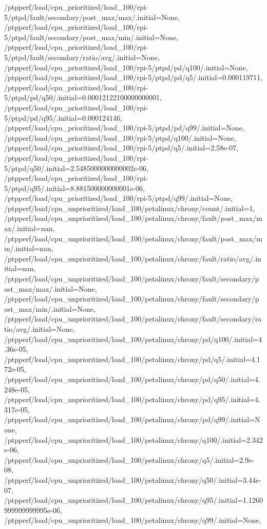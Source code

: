 {    /ptpperf/load/cpu_prioritized/load_100/rpi-5/ptpd/fault/secondary/post_max/max/.initial=None,
    /ptpperf/load/cpu_prioritized/load_100/rpi-5/ptpd/fault/secondary/post_max/min/.initial=None,
    /ptpperf/load/cpu_prioritized/load_100/rpi-5/ptpd/fault/secondary/ratio/avg/.initial=None,
    /ptpperf/load/cpu_prioritized/load_100/rpi-5/ptpd/pd/q100/.initial=None,
    /ptpperf/load/cpu_prioritized/load_100/rpi-5/ptpd/pd/q5/.initial=0.000119711,
    /ptpperf/load/cpu_prioritized/load_100/rpi-5/ptpd/pd/q50/.initial=0.00012122100000000001,
    /ptpperf/load/cpu_prioritized/load_100/rpi-5/ptpd/pd/q95/.initial=0.000124146,
    /ptpperf/load/cpu_prioritized/load_100/rpi-5/ptpd/pd/q99/.initial=None,
    /ptpperf/load/cpu_prioritized/load_100/rpi-5/ptpd/q100/.initial=None,
    /ptpperf/load/cpu_prioritized/load_100/rpi-5/ptpd/q5/.initial=2.58e-07,
    /ptpperf/load/cpu_prioritized/load_100/rpi-5/ptpd/q50/.initial=2.5485000000000002e-06,
    /ptpperf/load/cpu_prioritized/load_100/rpi-5/ptpd/q95/.initial=8.881500000000001e-06,
    /ptpperf/load/cpu_prioritized/load_100/rpi-5/ptpd/q99/.initial=None,
    /ptpperf/load/cpu_unprioritized/load_100/petalinux/chrony/count/.initial=1,
    /ptpperf/load/cpu_unprioritized/load_100/petalinux/chrony/fault/post_max/max/.initial=nan,
    /ptpperf/load/cpu_unprioritized/load_100/petalinux/chrony/fault/post_max/min/.initial=nan,
    /ptpperf/load/cpu_unprioritized/load_100/petalinux/chrony/fault/ratio/avg/.initial=nan,
    /ptpperf/load/cpu_unprioritized/load_100/petalinux/chrony/fault/secondary/post_max/max/.initial=None,
    /ptpperf/load/cpu_unprioritized/load_100/petalinux/chrony/fault/secondary/post_max/min/.initial=None,
    /ptpperf/load/cpu_unprioritized/load_100/petalinux/chrony/fault/secondary/ratio/avg/.initial=None,
    /ptpperf/load/cpu_unprioritized/load_100/petalinux/chrony/pd/q100/.initial=4.36e-05,
    /ptpperf/load/cpu_unprioritized/load_100/petalinux/chrony/pd/q5/.initial=4.172e-05,
    /ptpperf/load/cpu_unprioritized/load_100/petalinux/chrony/pd/q50/.initial=4.248e-05,
    /ptpperf/load/cpu_unprioritized/load_100/petalinux/chrony/pd/q95/.initial=4.317e-05,
    /ptpperf/load/cpu_unprioritized/load_100/petalinux/chrony/pd/q99/.initial=None,
    /ptpperf/load/cpu_unprioritized/load_100/petalinux/chrony/q100/.initial=2.342e-06,
    /ptpperf/load/cpu_unprioritized/load_100/petalinux/chrony/q5/.initial=2.9e-08,
    /ptpperf/load/cpu_unprioritized/load_100/petalinux/chrony/q50/.initial=3.44e-07,
    /ptpperf/load/cpu_unprioritized/load_100/petalinux/chrony/q95/.initial=1.1260999999999995e-06,
    /ptpperf/load/cpu_unprioritized/load_100/petalinux/chrony/q99/.initial=None,
}
